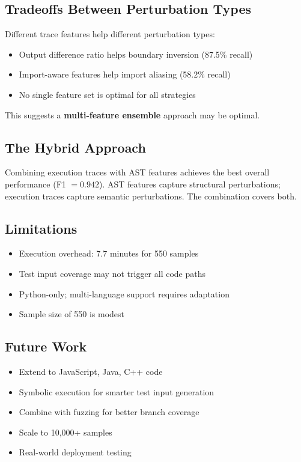 \documentclass[conference]{IEEEtran}
\begin{document}
\subsection{Tradeoffs Between Perturbation Types}

Different trace features help different perturbation types:
\begin{itemize}
    \item Output difference ratio helps boundary inversion (87.5\% recall)
    \item Import-aware features help import aliasing (58.2\% recall)
    \item No single feature set is optimal for all strategies
\end{itemize}

This suggests a \textbf{multi-feature ensemble} approach may be optimal.

\subsection{The Hybrid Approach}

Combining execution traces with AST features achieves the best overall performance (F1 $= 0.942$). AST features capture structural perturbations; execution traces capture semantic perturbations. The combination covers both.

\subsection{Limitations}

\begin{itemize}
    \item Execution overhead: 7.7 minutes for 550 samples
    \item Test input coverage may not trigger all code paths
    \item Python-only; multi-language support requires adaptation
    \item Sample size of 550 is modest
\end{itemize}

\subsection{Future Work}

\begin{itemize}
    \item Extend to JavaScript, Java, C++ code
    \item Symbolic execution for smarter test input generation
    \item Combine with fuzzing for better branch coverage
    \item Scale to 10,000+ samples
    \item Real-world deployment testing
\end{itemize}
\end{document}
